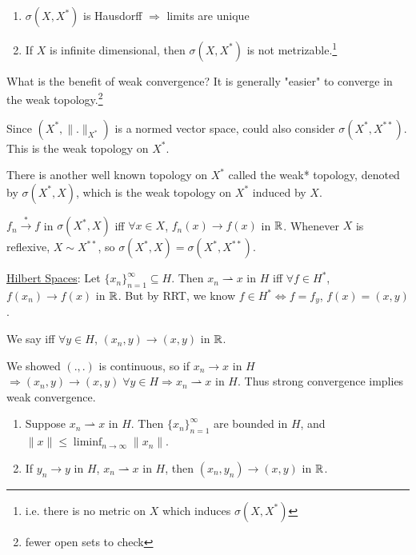 \begin{goal}[fact]
    \begin{enumerate}
        \item $\sigma(X, X^*)$ is Hausdorff $\Rightarrow$ limits are unique
        \item If $X$ is infinite dimensional, then $\sigma(X, X^*)$ is not metrizable.\footnote{i.e.
        there is no metric on $X$ which induces $\sigma(X, X^*)$}
    \end{enumerate}
\end{goal}
\begin{rem}
    What is the benefit of weak convergence? It is generally "easier" to converge in the
    weak topology.\footnote{fewer open sets to check}
\end{rem}

\begin{rem}
    Since $(X^*, \|  . \|_{X^*} )$ is a normed vector space, could also consider $\sigma(X^*, X^{**})$.
    This is the weak topology on $X^*$.   
\end{rem}

There is another well known topology on $X^*$ called the weak* topology, denoted by $\sigma(X^*, X)$, 
which is the weak topology on $X^*$ induced by $X$. 

$f_n \stackrel{*}{\to} f$ in $\sigma(X^*, X)$ iff $\forall x \in X$, $f_n(x) \to f(x)$ in $\mathbb{R}$. 
Whenever $X$ is reflexive, $X \sim X^{**}$, so $\sigma(X^*, X) = \sigma(X^*, X^{**})$.

\underline{Hilbert Spaces}:
Let $\{x_{n}\}_{n=1}^{\infty} \subseteq H$. Then $x_n \rightharpoonup x$ in $H$ iff $\forall f \in H^*$, $f(x_n) \to f(x)$ in $\mathbb{R}$. 
But by RRT, we know $f \in H^* \iff f = f_y$, $f(x) = (x, y)$.

\begin{defn}
    We say  iff $\forall y \in H$, $(x_n, y) \to (x, y)$ in $\mathbb{R}$.   
\end{defn}

\begin{rem}
    We showed $(. , .)$ is continuous, so if $x_n \to x$ in $H$ 
    $\Rightarrow (x_n, y) \to (x, y) \; \forall y \in H \Rightarrow x_n \rightharpoonup x$ in $H$.
    Thus strong convergence implies weak convergence.     
\end{rem}

\begin{prop}
    \begin{enumerate}
        \item Suppose $x_n \rightharpoonup x$ in $H$. Then $\{x_{n}\}_{n=1}^{\infty} $ are bounded in $H$,
        and $\| x \| \leq \liminf_{n \to \infty} \| x_n \|$.
        \item If $y_n \to y$ in $H$, $x_n \rightharpoonup x$ in $H$, then $(x_n, y_n) \to (x, y)$ in $\mathbb{R}$.       
    \end{enumerate}
\end{prop}

